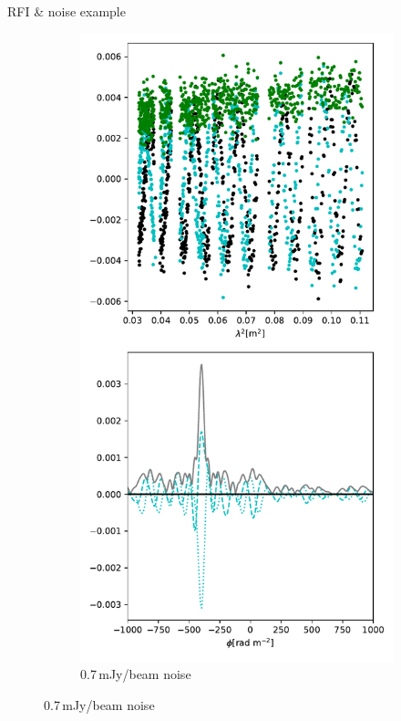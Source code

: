 \documentclass[xetex,aspectratio=169]{beamer}
\begin{document}
\begin{frame}{RFI \& noise example}
\begin{figure}
\begin{subfigure}{0.2\textwidth}
		\end{subfigure}
		\begin{subfigure}{0.2\textwidth}
			\includegraphics[width=\textwidth]{figures/dataset_features/data_noisy.pdf}
			\caption{0.7\,mJy/beam noise}
		\end{subfigure}
	\end{figure}

\end{frame}
\end{document}
